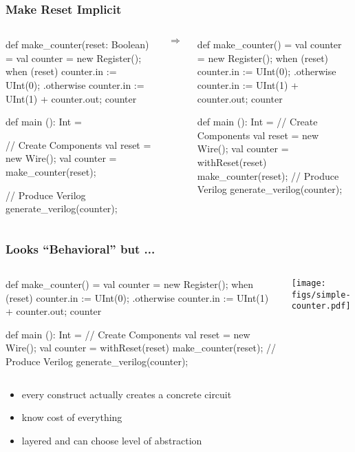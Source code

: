 \begin{frame}[fragile]
\frametitle{Make Reset Implicit}
\begin{columns}
{
\begin{scala}
def make_counter(reset: Boolean) = {
  val counter = new Register();
  when (reset) {
    counter.in := UInt(0);
  } .otherwise {
    counter.in := UInt(1) + counter.out;
  }
  counter
}

def main (): Int = {
  // Create Components
  val reset   = new Wire();
  val counter = make_counter(reset);

  // Produce Verilog
  generate_verilog(counter);
}
\end{scala}
}
\begin{center}
$\Rightarrow$
\end{center}
{
\begin{scala}
def make_counter() = {
  val counter = new Register();
  when (reset) {
    counter.in := UInt(0);
  } .otherwise {
    counter.in := UInt(1) + counter.out;
  }
  counter
}

def main (): Int = {
  // Create Components
  val reset   = new Wire();
  val counter = 
    withReset(reset) {
      make_counter(reset);
    }
  // Produce Verilog
  generate_verilog(counter);
}
\end{scala}
}
\end{columns}
\end{frame}

\begin{frame}[fragile]
\frametitle{Looks ``Behavioral'' but ...}
\begin{columns}
{
\begin{scala}
def make_counter() = {
  val counter = new Register();
  when (reset) {
    counter.in := UInt(0);
  } .otherwise {
    counter.in := UInt(1) + counter.out;
  }
  counter
}

def main (): Int = {
  // Create Components
  val reset   = new Wire();
  val counter = 
    withReset(reset) {
      make_counter(reset);
    }
  // Produce Verilog
  generate_verilog(counter);
}
\end{scala}
}
\begin{center}
\texttt{[image: figs/simple-counter.pdf]}
\end{center}
\end{columns}
\begin{itemize}
\item every construct actually creates a concrete circuit
\item know cost of everything
\item layered and can choose level of abstraction
\end{itemize}
\end{frame}

